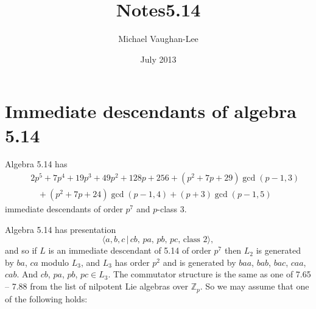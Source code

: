 \documentclass[10pt,thmsa]{article}
\begin{document}
\author{Michael Vaughan-Lee}
\title{Notes5.14}
\date{July 2013}
\maketitle

\section{Immediate descendants of algebra 5.14}

Algebra 5.14 has 
\begin{eqnarray*}
&&2p^{5}+7p^{4}+19p^{3}+49p^{2}+128p+256+(p^{2}+7p+29)\gcd (p-1,3) \\
&&\;\;\;+(p^{2}+7p+24)\gcd (p-1,4)+(p+3)\gcd (p-1,5)
\end{eqnarray*}%
immediate descendants of order $p^{7}$ and $p$-class $3$.

Algebra 5.14 has presentation 
\[
\langle a,b,c\,|\,cb,\,pa,\,pb,\,pc,\,\text{class }2\rangle , 
\]
and so if $L$ is an immediate descendant of 5.14 of order $p^7$ then $L_2$
is generated by $ba$, $ca$ modulo $L_3$, and $L_3$ has order $p^2$ and is
generated by $baa$, $bab$, $bac$, $caa$, $cab$. And $cb$, $pa$, $pb$, $pc\in
L_3$. The commutator structure is the same as one of 7.65 -- 7.88 from the
list of nilpotent Lie algebras over $\mathbb{Z}_p$. So we may assume that
one of the following holds:
\end{document}
